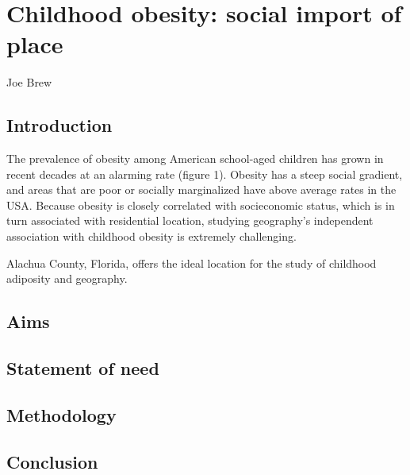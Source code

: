 \documentclass[11pt]{article}
\begin{document}


\fancyhfoffset[E,O]{0pt}

\section*{Childhood obesity: social import of place}
Joe Brew 

\noindent \hrulefill


\subsection*{Introduction}
The prevalence of obesity among American school-aged children has grown in recent decades at an alarming rate (figure 1)\cite{Ogden2014}. Obesity has a steep social gradient, and areas that are poor or socially marginalized have above average rates in the USA.\cite{Budd2014} Because obesity is closely correlated with socieconomic status, which is in turn associated with residential location, studying geography's independent association with childhood obesity is extremely challenging. 

Alachua County, Florida, offers the ideal location for the study of childhood adiposity and geography.  

\subsection*{Aims}


\subsection*{Statement of need}


\subsection*{Methodology}


\subsection*{Conclusion}
\end{document}
